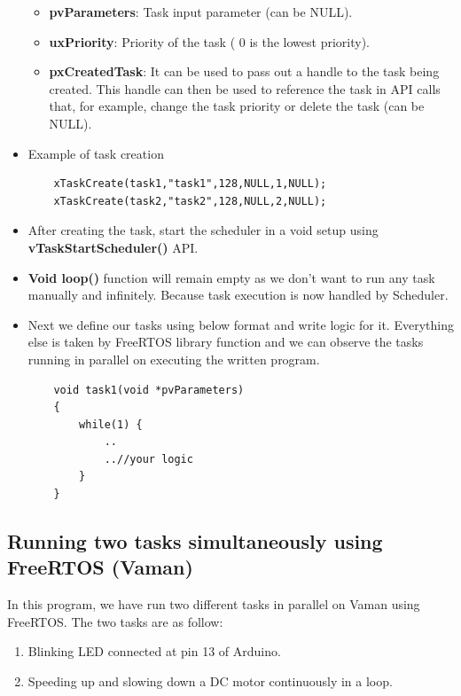 \begin{itemize}
\begin{itemize}
        \item \textbf{pvParameters}: Task input parameter (can be NULL).
        \item \textbf{uxPriority}: Priority of the task ( 0 is the lowest priority).
        \item \textbf{pxCreatedTask}: It can be used to pass out a handle to the task being created. This handle can then be used to reference the task in API calls that, for example, change the task priority or delete the task (can be NULL).
    \end{itemize}
    \item Example of task creation
    \begin{lstlisting}
    xTaskCreate(task1,"task1",128,NULL,1,NULL);
    xTaskCreate(task2,"task2",128,NULL,2,NULL);  
    \end{lstlisting}
    \item After creating the task, start the scheduler in a void setup using \textbf{vTaskStartScheduler()} API.
    \item \textbf{Void loop()} function will remain empty as we don’t want to run any task manually and infinitely. Because task execution is now handled by Scheduler.
    \item Next we define our tasks using below format and write logic for it. Everything else is taken by FreeRTOS library function and we can observe the tasks running in parallel on executing the written program.
    \begin{lstlisting}
    void task1(void *pvParameters)  
    {
        while(1) {
            ..
            ..//your logic
        }
    }
    \end{lstlisting}
\end{itemize}


\subsection{Running two tasks simultaneously using FreeRTOS (Vaman) }

In this program, we have run two different tasks in parallel on Vaman using FreeRTOS. The two tasks are as follow:
\begin{enumerate}
    \item Blinking LED connected at pin 13 of Arduino.
    \item Speeding up and slowing down a DC motor continuously in a loop.
\end{enumerate}

